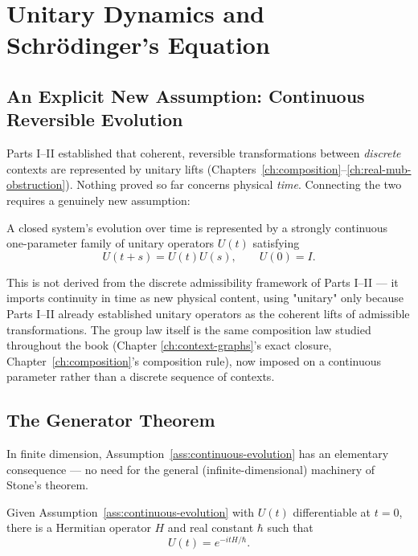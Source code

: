 \chapter{Unitary Dynamics and Schr\"odinger's Equation}
\label{ch:dynamics}

\section{An Explicit New Assumption: Continuous Reversible Evolution}

Parts I--II established that coherent, reversible transformations between
\emph{discrete} contexts are represented by unitary lifts
(Chapters~\ref{ch:composition}--\ref{ch:real-mub-obstruction}). Nothing
proved so far concerns physical \emph{time}. Connecting the two requires a
genuinely new assumption:

\begin{assumption}
\label{ass:continuous-evolution}
A closed system's evolution over time is represented by a strongly
continuous one-parameter family of unitary operators $U(t)$ satisfying
\begin{equation}
U(t+s) = U(t)U(s), \qquad U(0) = I.
\end{equation}
\end{assumption}

This is not derived from the discrete admissibility framework of Parts I--II
— it imports continuity in time as new physical content, using "unitary"
only because Parts I--II already established unitary operators as the
coherent lifts of admissible transformations. The group law itself is the
same composition law studied throughout the book (Chapter
\ref{ch:context-graphs}'s exact closure, Chapter~\ref{ch:composition}'s
composition rule), now imposed on a continuous parameter rather than a
discrete sequence of contexts.

\section{The Generator Theorem}

In finite dimension, Assumption~\ref{ass:continuous-evolution} has an
elementary consequence — no need for the general (infinite-dimensional)
machinery of Stone's theorem.

\begin{theorem}
\label{thm:generator}
Given Assumption~\ref{ass:continuous-evolution} with $U(t)$ differentiable at
$t=0$, there is a Hermitian operator $H$ and real constant $\hbar$ such that
\begin{equation}
U(t) = e^{-itH/\hbar}.
\end{equation}
\end{theorem}

